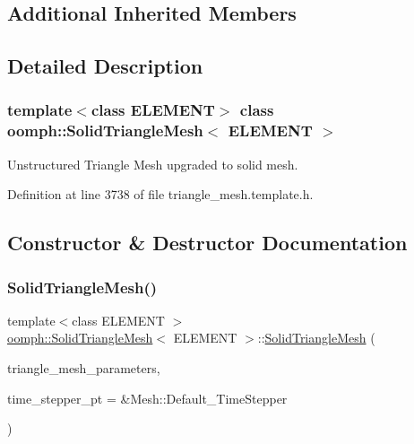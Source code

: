 \subsection*{Additional Inherited Members}


\subsection{Detailed Description}
\subsubsection*{template$<$class E\+L\+E\+M\+E\+NT$>$\newline
class oomph\+::\+Solid\+Triangle\+Mesh$<$ E\+L\+E\+M\+E\+N\+T $>$}

Unstructured Triangle Mesh upgraded to solid mesh. 

Definition at line 3738 of file triangle\+\_\+mesh.\+template.\+h.



\subsection{Constructor \& Destructor Documentation}
\mbox{\label{classoomph_1_1SolidTriangleMesh_a0319b61fc3444922e2b55c9978f381f3}} 
\subsubsection{\texorpdfstring{Solid\+Triangle\+Mesh()}{SolidTriangleMesh()}\hspace{0.1cm}{\footnotesize\ttfamily [1/2]}}
{\footnotesize\ttfamily template$<$class E\+L\+E\+M\+E\+NT $>$ \\
\hyperlink{classoomph_1_1SolidTriangleMesh}{oomph\+::\+Solid\+Triangle\+Mesh}$<$ E\+L\+E\+M\+E\+NT $>$\+::\hyperlink{classoomph_1_1SolidTriangleMesh}{Solid\+Triangle\+Mesh} (\begin{DoxyParamCaption}\item[{\hyperlink{classoomph_1_1TriangleMeshParameters}{Triangle\+Mesh\+Parameters} \&}]{triangle\+\_\+mesh\+\_\+parameters,  }\item[{Time\+Stepper $\ast$}]{time\+\_\+stepper\+\_\+pt = {\ttfamily \&Mesh\+:\+:Default\+\_\+TimeStepper} }\end{DoxyParamCaption})\hspace{0.3cm}{\ttfamily [inline]}}



